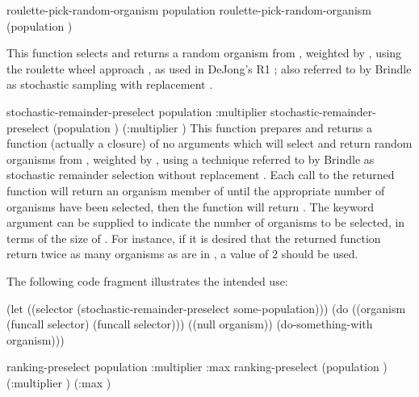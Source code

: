 {	\filbreak
	{\samepage
		\Defmethod roulette-pick-random-organism {population}
		 roulette-pick-random-organism {(population )}
		
		This function selects and returns a random organism from , weighted by
		, using the roulette wheel approach \cite{ga:goldberg}, as used in
		DeJong's R1 \cite{ga:dejong-thesis}; also referred to by Brindle as stochastic
		sampling with replacement \cite{ga:brindle}.
		\par}%
	
	\filbreak
	{\samepage
		\Defmethod stochastic-remainder-preselect {population \key :multiplier}
		 stochastic-remainder-preselect {(population )
			\key (:multiplier )}
		\label{population:stochastic-remainder-preselect}
		This function prepares and returns a function (actually a closure) of no arguments which will
		select and return random organisms from , weighted by , using a
		technique referred to by Brindle as stochastic remainder selection without replacement
		\cite{ga:brindle}. Each call to the returned function will return an organism member of
		 until the appropriate number of organisms have been selected, then the
		function will return . The  keyword argument can be supplied to
		indicate the number of organisms to be selected, in terms of the size of .
		For instance, if it is desired that the returned function return twice as many organisms as
		are in , a  value of $2$ should be used.
		\par}%
	
	\filbreak
	{\samepage
		The following code fragment illustrates the intended use:
		\begin{clcode}(let ((selector (stochastic-remainder-preselect some-population)))
  (do ((organism (funcall selector) (funcall selector)))
      ((null organism))
    (do-something-with organism)))\end{clcode}
	}%
	
	\filbreak
	
	{\samepage
		\Defmethod ranking-preselect {population \key :multiplier :max}
		\label{method:ranking-preselect}
		 ranking-preselect {(population )
			\key (:multiplier ) (:max )}
		
}}
